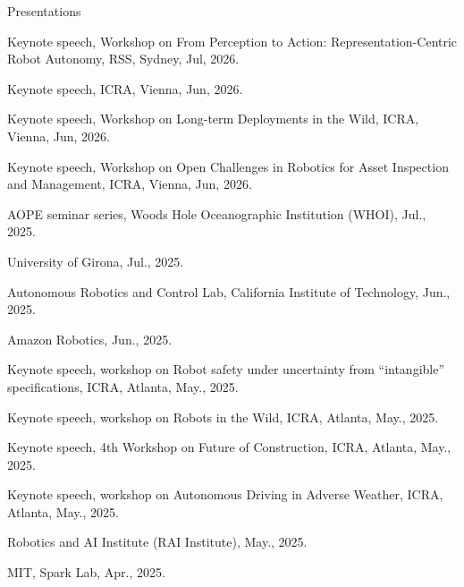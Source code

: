 \begin{rSection}{Presentations}

\begin{pubSubsectionNum}{}
  \item Keynote speech, Workshop on From Perception to Action: Representation-Centric Robot Autonomy, RSS, Sydney, Jul, 2026.


  \item Keynote speech, ICRA, Vienna, Jun, 2026.
  
  \item Keynote speech, Workshop on Long-term Deployments in the Wild, ICRA, Vienna, Jun, 2026.
   
  \item Keynote speech, Workshop on Open Challenges in Robotics for Asset Inspection and Management, ICRA, Vienna, Jun, 2026.
    
  \item AOPE seminar series, Woods Hole Oceanographic Institution (WHOI), Jul., 2025.
  
  \item University of Girona, Jul., 2025.
   
  \item Autonomous Robotics and Control Lab, California Institute of Technology, Jun., 2025.
  
  \item Amazon Robotics, Jun., 2025.
  
  \item Keynote speech, workshop on Robot safety under uncertainty from ``intangible'' specifications, ICRA, Atlanta, May., 2025.
  
  \item Keynote speech, workshop on Robots in the Wild, ICRA, Atlanta, May., 2025.
  
  \item Keynote speech, 4th Workshop on Future of Construction, ICRA, Atlanta, May., 2025.
  
  \item Keynote speech, workshop on  Autonomous Driving in Adverse Weather, ICRA, Atlanta, May., 2025.
  
  \item Robotics and AI Institute (RAI Institute), May., 2025.
  
  \item MIT, Spark Lab, Apr., 2025.
  

\end{pubSubsectionNum}
\end{rSection}
